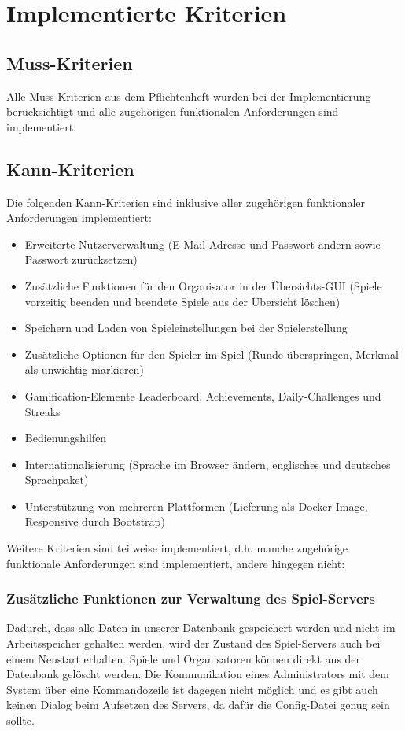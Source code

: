 \documentclass[a4paper]{scrreprt}
\begin{document}
\chapter{Implementierte Kriterien}

\section{Muss-Kriterien}
Alle Muss-Kriterien aus dem Pflichtenheft wurden bei der Implementierung berücksichtigt und alle zugehörigen funktionalen Anforderungen sind implementiert.


\section{Kann-Kriterien}
Die folgenden Kann-Kriterien sind inklusive aller zugehörigen funktionaler Anforderungen implementiert:

\begin{itemize}
\item Erweiterte Nutzerverwaltung (E-Mail-Adresse und Passwort ändern sowie Passwort zurücksetzen)
\item Zusätzliche Funktionen für den Organisator in der Übersichts-GUI (Spiele vorzeitig beenden und beendete Spiele aus der Übersicht löschen)
\item Speichern und Laden von Spieleinstellungen bei der Spielerstellung
\item Zusätzliche Optionen für den Spieler im Spiel (Runde überspringen, Merkmal als unwichtig markieren)
\item Gamification-Elemente Leaderboard, Achievements, Daily-Challenges und Streaks
\item Bedienungshilfen
\item Internationalisierung (Sprache im Browser ändern, englisches und deutsches Sprachpaket)
\item Unterstützung von mehreren Plattformen (Lieferung als Docker-Image, Responsive durch Bootstrap)
\end{itemize}

\hspace{1cm}

Weitere Kriterien sind teilweise implementiert, d.h. manche zugehörige funktionale Anforderungen sind implementiert, andere hingegen nicht:

\subsection{Zusätzliche Funktionen zur Verwaltung des Spiel-Servers}
Dadurch, dass alle Daten in unserer Datenbank gespeichert werden und nicht im Arbeitsspeicher gehalten werden, wird der Zustand des Spiel-Servers auch bei einem Neustart erhalten. Spiele und Organisatoren können direkt aus der Datenbank gelöscht werden. Die Kommunikation eines Administrators mit dem System über eine Kommandozeile ist dagegen nicht möglich und es gibt auch keinen Dialog beim Aufsetzen des Servers, da dafür die Config-Datei genug sein sollte.
\end{document}
